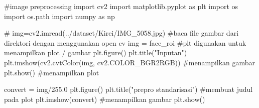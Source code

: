 \documentclass[
  letterpaper,
  DIV=11,
  numbers=noendperiod]{scrreprt}
\newenvironment{Shaded}{\begin{snugshade}}{\end{snugshade}}
\newcommand{\CommentTok}[1]{\textcolor[rgb]{0.37,0.37,0.37}{#1}}
\newcommand{\FloatTok}[1]{\textcolor[rgb]{0.68,0.00,0.00}{#1}}
\newcommand{\ImportTok}[1]{\textcolor[rgb]{0.00,0.46,0.62}{#1}}
\newcommand{\NormalTok}[1]{\textcolor[rgb]{0.00,0.23,0.31}{#1}}
\newcommand{\OperatorTok}[1]{\textcolor[rgb]{0.37,0.37,0.37}{#1}}
\newcommand{\StringTok}[1]{\textcolor[rgb]{0.13,0.47,0.30}{#1}}
\begin{document}
\begin{Shaded}
\begin{Highlighting}[]
\CommentTok{\#image preprocessing}
\ImportTok{import}\NormalTok{ cv2}
\ImportTok{import}\NormalTok{ matplotlib.pyplot }\ImportTok{as}\NormalTok{ plt}
\ImportTok{import}\NormalTok{ os}
\ImportTok{import}\NormalTok{ os.path}
\ImportTok{import}\NormalTok{ numpy }\ImportTok{as}\NormalTok{ np}

\CommentTok{\# img=cv2.imread(\textquotesingle{}../dataset/Kirei/IMG\_5058.jpg\textquotesingle{}) \#baca file gambar dari direktori dengan menggunakan open cv}
\NormalTok{img }\OperatorTok{=}\NormalTok{ face\_roi}
\CommentTok{\#plt digunakan untuk menampilkan plot / gambar}
\NormalTok{plt.figure()}
\NormalTok{plt.title(}\StringTok{"Inputan"}\NormalTok{)}
\NormalTok{plt.imshow(cv2.cvtColor(img, cv2.COLOR\_BGR2RGB)) }\CommentTok{\#menampilkan gambar}
\NormalTok{plt.show() }\CommentTok{\#menampilkan plot}

\NormalTok{convert }\OperatorTok{=}\NormalTok{ img}\OperatorTok{/}\FloatTok{255.0}
\NormalTok{plt.figure()}
\NormalTok{plt.title(}\StringTok{"prepro standarisasi"}\NormalTok{) }\CommentTok{\#membuat judul pada plot}
\NormalTok{plt.imshow(convert) }\CommentTok{\#menampilkan gambar}
\NormalTok{plt.show()}
\end{Highlighting}
\end{Shaded}
\end{document}
